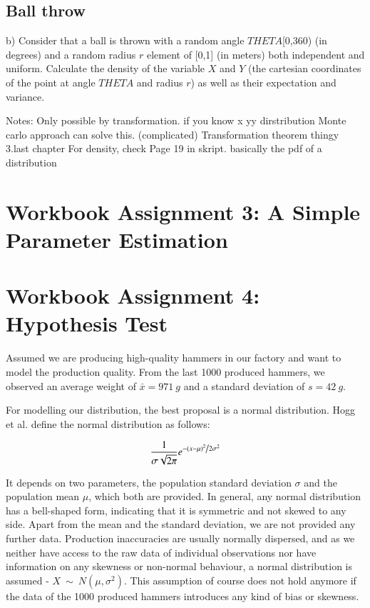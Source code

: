 \section{Ball throw}
b) Consider that a ball is thrown with a random angle $THETA$[0,360) (in degrees) and a random radius $r$ element of [0,1] (in meters) both independent and uniform. Calculate the density of the variable $X$ and $Y$ (the cartesian coordinates of the point at angle $THETA$ and radius $r$) as well as their expectation and variance.

Notes:
Only possible by transformation. if you know x yy dirstribution 
Monte carlo approach can solve this. (complicated)
Transformation theorem thingy 3.last chapter
For density, check Page 19 in skript. basically the pdf of a distribution




\chapter{Workbook Assignment 3: A Simple Parameter Estimation}	
\chapter{Workbook Assignment 4: Hypothesis Test}	

Assumed we are producing high-quality hammers in our factory and want to model the production quality. From the last 1000 produced hammers, we observed an average weight of $\bar{x}=971~g$ and a standard deviation of $s=42~g$.

For modelling our distribution, the best proposal is a normal distribution. Hogg et al. \cite[Definition~3.4.1]{hogg} define the normal distribution as follows: 

\begin{equation} \frac{1}{{\sigma \sqrt {2\pi } }}e^{{{ - \left( {x - \mu } \right)^2 } \mathord{\left/ {\vphantom {{ - \left( {x - \mu } \right)^2 } {2\sigma ^2 }}} \right. \kern-\nulldelimiterspace}{2\sigma ^2 }}}
\label{eq:normaldist}
\end{equation}


It depends on two parameters, the population standard deviation $\sigma$ and the population mean $\mu$, which both are provided. In general, any normal distribution has a bell-shaped form, indicating that it is symmetric and not skewed to any side. Apart from the mean and the standard deviation, we are not provided any further data. Production inaccuracies are usually normally dispersed, and as we neither have access to the raw data of individual observations nor have information on any skewness or non-normal behaviour, a normal distribution is assumed - $ X~\sim~N(\mu, \sigma^2)$. This assumption of course does not hold anymore if the data of the 1000 produced hammers introduces any kind of bias or skewness. 


